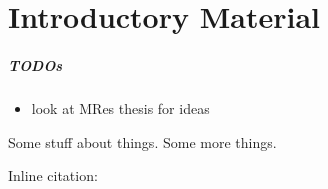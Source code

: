 

\chapter{Introductory Material}
\label{chapterlabel1}

\paragraph{TODOs}

\begin{itemize}
	\item look at MRes thesis for ideas
\end{itemize}
Some stuff about things.\cite{example-citation} Some more things. 

Inline citation: 

\blindmathpaper
